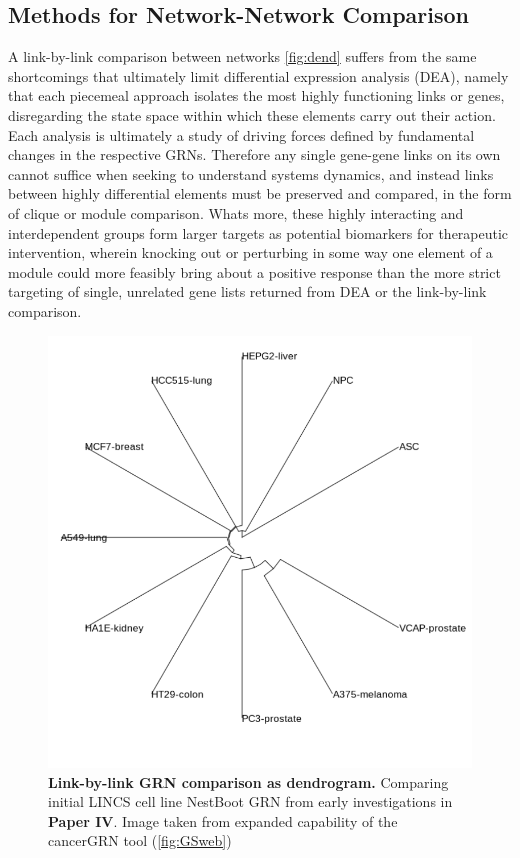 \subsection{Methods for Network-Network Comparison}
\label{sec:net_com}
A link-by-link comparison between networks \cref{fig:dend} suffers from the same shortcomings that ultimately limit differential expression analysis (DEA), namely that each piecemeal approach isolates the most highly functioning links or genes, disregarding the state space within which these elements carry out their action. Each analysis is ultimately a study of driving forces defined by fundamental changes in the respective GRNs. Therefore any single gene-gene links on its own cannot suffice when seeking to understand systems dynamics, and instead links between highly differential elements must be preserved and compared, in the form of clique or module comparison. Whats more, these highly interacting and interdependent groups form larger targets as potential biomarkers for therapeutic intervention, wherein knocking out or perturbing in some way one element of a module could more feasibly bring about a positive response than the more strict targeting of single, unrelated gene lists returned from DEA or the link-by-link comparison.

\begin{figure}
\centering
\includegraphics[width=.75\linewidth]{4/better_dendrogram.png}
\caption{\textbf{Link-by-link GRN comparison as dendrogram.} Comparing initial LINCS cell line NestBoot GRN from early investigations in \textbf{Paper IV}. Image taken from expanded capability of the cancerGRN tool (\cref{fig:GSweb})}%
\end{figure}

